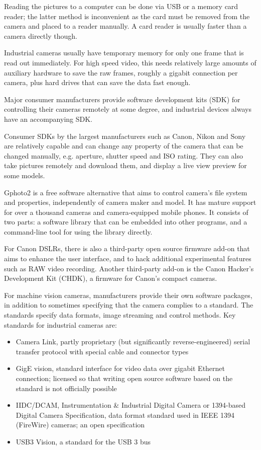 Reading the pictures to a computer can be done via USB or a memory card reader; the latter method is inconvenient as the card must be removed from the camera and placed to a reader manually.
A card reader is usually faster than a camera directly though.

Industrial cameras usually have temporary memory for only one frame that is read out immediately.
For high speed video, this needs relatively large amounts of auxiliary hardware to save the raw frames, roughly a gigabit connection per camera, plus hard drives that can save the data fast enough.

Major consumer manufacturers provide software development kits (SDK) for controlling their cameras remotely at some degree, and industrial devices always have an accompanying SDK.

Consumer SDKs by the largest manufacturers such as Canon, Nikon and Sony are relatively capable and can change any property of the camera that can be changed manually, e.g. aperture, shutter speed and ISO rating.
They can also take pictures remotely and download them, and display a live view preview for some models.

Gphoto2 is a free software alternative that aims to control camera's file system and properties, independently of camera maker and model.
It has mature support for over a thousand cameras and camera-equipped mobile phones.
It consists of two parts: a software library that can be embedded into other programs, and a command-line tool for using the library directly.

For Canon DSLRs, there is also a third-party open source firmware add-on that aims to enhance the user interface, and to hack additional experimental features such as RAW video recording.
Another third-party add-on is the Canon Hacker's Development Kit (CHDK), a firmware for Canon's compact cameras.

For machine vision cameras, manufacturers provide their own software packages, in addition to sometimes specifying that the camera complies to a standard.
The standards specify data formats, image streaming and control methods.
Key standards for industrial cameras are:

\begin{itemize}
	\item Camera Link, partly proprietary (but significantly reverse-engineered) serial transfer protocol with special cable and connector types
	\item GigE vision, standard interface for video data over gigabit Ethernet connection; licensed so that writing open source software based on the standard is not officially possible
	\item IIDC/DCAM, Instrumentation \& Industrial Digital Camera or 1394-based Digital Camera Specification, data format standard used in IEEE 1394 (FireWire) cameras; an open specification
	\item USB3 Vision, a standard for the USB 3 bus
\end{itemize}

